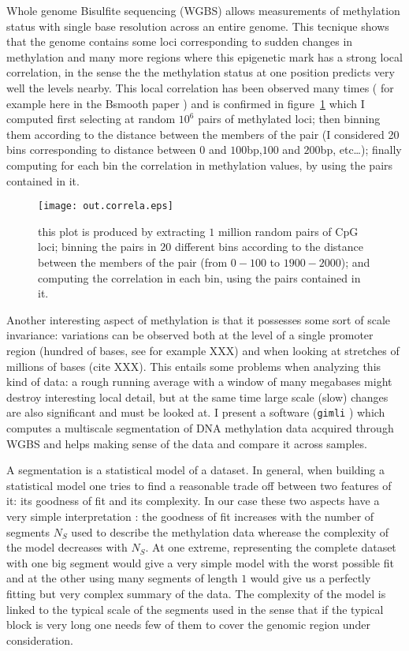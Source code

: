 \documentclass[11pt]{amsart}
\newcommand{\gimli}{\texttt{gimli} }
\begin{document}
Whole genome Bisulfite sequencing (WGBS) allows measurements of methylation 
status with single base resolution across an entire genome. This tecnique shows 
that the genome contains some loci corresponding to sudden changes in methylation 
and many more regions where this epigenetic mark has a strong local
correlation, in the sense the the methylation status at one position predicts 
very well the levels nearby. 
This local correlation has been observed many times ( for example
here in the Bsmooth paper \cite{bsmooth}) and is confirmed in 
figure~\ref{corr} which I computed 
first selecting at random $10^6$ pairs of  methylated loci; then binning
them according to the distance between the members of the pair (I considered 20 
bins corresponding to distance between $0$ and $100$bp,$100$ and $200$bp, 
etc\dots);
finally computing for each bin the correlation in methylation values, 
by using the pairs contained in it.

\begin{center}
\begin{figure}\label{corr}
\texttt{[image: out.correla.eps]}
\caption{this plot is produced by extracting $1$ million random pairs of CpG loci;
binning the pairs in $20$ different bins  according to the distance between the members
of the pair (from $0-100$ to $1900-2000$); and computing the correlation in each bin,
using the pairs contained in it.}
\end{figure}
\end{center}

Another interesting aspect of methylation is that it possesses some sort of scale 
invariance: variations can be observed both at the level of a single promoter
region (hundred of bases, see for example XXX) and when looking at stretches
of millions of bases (cite XXX).
This entails some problems when analyzing this kind of data: a rough
running average with a window of many megabases might destroy interesting
local detail, but at the same time large scale (slow) changes are also
significant and must be looked at.
I present  a software (\gimli) which computes a multiscale segmentation of DNA methylation 
data acquired through WGBS and helps making sense of the data and compare 
it across samples.

A segmentation is a statistical model of a dataset.
In general, when building a statistical model one tries to find a reasonable 
trade off between two 
features of it: its goodness of fit and its complexity.
In our case these two aspects have a very simple interpretation : the goodness 
of fit increases with the number of segments $N_S$ used to describe the 
methylation data wherease the complexity of the model decreases with $N_S$.  
At one extreme, representing the complete dataset with one big segment would 
give a very simple model with the worst possible fit and 
at the other using many segments of length $1$ would give us a perfectly 
fitting but very complex summary of the data.
The complexity of the model is linked to the typical scale of the segments used
in the sense that if the typical block is very long one needs few of them to 
cover the genomic region under consideration.
\end{document}
